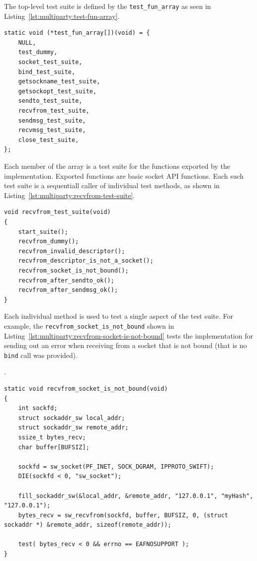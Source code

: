 The top-level test suite is defined by the \texttt{test\_fun\_array} as seen
in Listing~\ref{lst:multiparty:test-fun-array}.

\lstset{language=C,caption=Test Suite Top-Level
Array,label=lst:multiparty:test-fun-array}
\begin{lstlisting}
static void (*test_fun_array[])(void) = {
    NULL,
    test_dummy,
    socket_test_suite,
    bind_test_suite,
    getsockname_test_suite,
    getsockopt_test_suite,
    sendto_test_suite,
    recvfrom_test_suite,
    sendmsg_test_suite,
    recvmsg_test_suite,
    close_test_suite,
};
\end{lstlisting}

Each member of the array is a test suite for the functions exported by the
implementation. Exported functions are basic socket API functions. Each such
test suite is a sequentiall caller of individual test methods, as shown in
Listing~\ref{lst:multiparty:recvfrom-test-suite}.

\lstset{language=C,caption=Test Suite for recvfrom Call,label=lst:multiparty:recvfrom-test-suite}
\begin{lstlisting}
void recvfrom_test_suite(void)
{
    start_suite();
    recvfrom_dummy();
    recvfrom_invalid_descriptor();
    recvfrom_descriptor_is_not_a_socket();
    recvfrom_socket_is_not_bound();
    recvfrom_after_sendto_ok();
    recvfrom_after_sendmsg_ok();
}
\end{lstlisting}

Each individual method is used to test a single aspect of the test suite. For
example, the \texttt{recvfrom\_socket\_is\_not\_bound} shown in
Listing~\ref{lst:multiparty:recvfrom-socket-is-not-bound} tests the
implementation for sending out an error when receiving from a socket that is
not bound (that is no \texttt{bind} call was provided).

\lstset{language=C,caption=Basic Method for Testing recvfrom
Call,label=lst:multiparty:recvfrom-socket-is-not-bound}.
\begin{lstlisting}
static void recvfrom_socket_is_not_bound(void)
{
    int sockfd;
    struct sockaddr_sw local_addr;
    struct sockaddr_sw remote_addr;
    ssize_t bytes_recv;
    char buffer[BUFSIZ];

    sockfd = sw_socket(PF_INET, SOCK_DGRAM, IPPROTO_SWIFT);
    DIE(sockfd < 0, "sw_socket");

    fill_sockaddr_sw(&local_addr, &remote_addr, "127.0.0.1", "myHash", "127.0.0.1");
    bytes_recv = sw_recvfrom(sockfd, buffer, BUFSIZ, 0, (struct sockaddr *) &remote_addr, sizeof(remote_addr));

    test( bytes_recv < 0 && errno == EAFNOSUPPORT );
}
\end{lstlisting}

